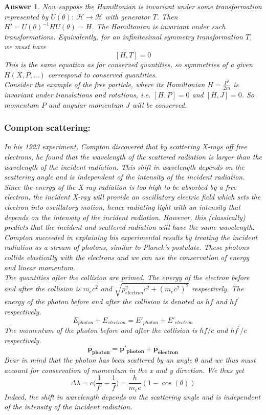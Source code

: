 \documentclass[a4paper]{article}
\newtheorem{ans}{Answer}[subsection]
\theoremstyle{new}
\begin{document}
\begin{ans}
Now suppose the Hamiltonian is invariant under some transformation represented by $U(\theta):~\mathcal{H}\rightarrow\mathcal{H}$ with generator $T$. Then $H'=U(\theta)^{-1}HU(\theta)=H$. The Hamiltonian is invariant under such transformations. Equivalently, for an infinitesimal symmetry transformation $T$, we must have
$$[H,T]=0$$
This is the same equation as for conserved quantities, so symmetries of a given $H(X,P,...)$ correspond to conserved quantities.\\[5pt]
Consider the example of the free particle, where its Hamiltonian $H=\frac{P^2}{2m}$ is invariant under translations and rotations, i.e. $[H,P]=0$ and $[H,J]=0$. So momentum $P$ and angular momentum $J$ will be conserved. 
\newpage
\subsubsection*{Compton scattering:}
In his 1923 experiment, Compton discovered that by scattering X-rays off free electrons, he found that the wavelength of the scattered radiation is larger than the wavelength of the incident radiation. This shift in wavelength depends on the scattering angle and is independent of the intensity of the incident radiation.\\[5pt]
Since the energy of the X-ray radiation is too high to be absorbed by a free electron, the incident X-ray will provide an oscillatory electric field which sets the electron into oscillatory motion, hence radiating light with an intensity that depends on the intensity of the incident radiation. However, this (classically) predicts that the incident and scattered radiation will have the same wavelength.\\[5pt]
Compton succeeded in explaining his experimental results by treating the incident radiation as a stream of photons, similar to Planck's postulate. These photons collide elastically with the electrons and we can use the conservation of energy and linear momentum.\\[5pt]
The quantities after the collision are primed. The energy of the electron before and after the collision is $m_ec^2$ and $\sqrt{p_{electron}^2c^2+(m_ec^2)^2}$ respectively. The energy of the photon before and after the collision is denoted as $hf$ and $hf^\prime$ respectively.
$$E_{photon}+E_{electron}=E'_{photon}+E'_{electron}$$
The momentum of the photon before and after the collision is $hf/c$ and $hf^\prime/c$ respectively.
$$\mathbf{p_{photon}=p'_{photon}+p_{electron}}$$
Bear in mind that the photon has been scattered by an angle $\theta$ and we thus must account for conservation of momentum in the x and y direction. We thus get
$$\Delta\lambda=c\bigg(\frac{1}{f'}-\frac{1}{f}\bigg)=\frac{h}{m_ec}(1-\cos(\theta))$$
Indeed, the shift in wavelength depends on the scattering angle and is independent of the intensity of the incident radiation.
\newpage

\end{ans}
\end{document}
